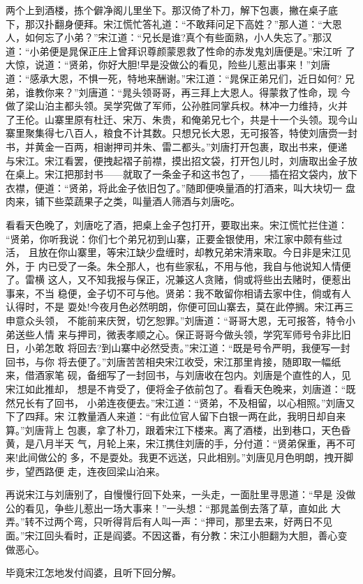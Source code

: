 两个上到酒楼，拣个僻净阁儿里坐下。那汉倚了朴刀，解下包裹，撇在桌子底
下，那汉扑翻身便拜。宋江慌忙答礼道：“不敢拜问足下高姓？”那人道：“大恩
人，如何忘了小弟？”宋江道：“兄长是谁?真个有些面熟，小人失忘了。”那汉
道：“小弟便是晁保正庄上曾拜识尊颜蒙恩救了性命的赤发鬼刘唐便是。”宋江听
了大惊，说道：“贤弟，你好大胆!早是没做公的看见，险些儿惹出事来！”刘唐
道：“感承大恩，不惧一死，特地来酬谢。”宋江道：“晁保正弟兄们，近日如何?
兄弟，谁教你来？”刘唐道：“晁头领哥哥，再三拜上大恩人。得蒙救了性命，现
今做了梁山泊主都头领。吴学究做了军师，公孙胜同掌兵权。林冲一力维持，火并
了王伦。山寨里原有杜迁、宋万、朱贵，和俺弟兄七个，共是十一个头领。现今山
寨里聚集得七八百人，粮食不计其数。只想兄长大恩，无可报答，特使刘唐赍一封
书，并黄金一百两，相谢押司并朱、雷二都头。”刘唐打开包裹，取出书来，便递
与宋江。宋江看罢，便拽起褶子前襟，摸出招文袋，打开包儿时，刘唐取出金子放
在桌上。宋江把那封书——就取了一条金子和这书包了，——插在招文袋内，放下
衣襟，便道：“贤弟，将此金子依旧包了。”随即便唤量酒的打酒来，叫大块切一
盘肉来，铺下些菜蔬果子之类，叫量酒人筛酒与刘唐吃。

看看天色晚了，刘唐吃了酒，把桌上金子包打开，要取出来。宋江慌忙拦住道：
“贤弟，你听我说：你们七个弟兄初到山寨，正要金银使用，宋江家中颇有些过活，
且放在你山寨里，等宋江缺少盘缠时，却教兄弟宋清来取。今日非是宋江见外，于
内已受了一条。朱仝那人，也有些家私，不用与他，我自与他说知人情便了。雷横
这人，又不知我报与保正，况兼这人贪赌，倘或将些出去赌时，便惹出事来，不当
稳便，金子切不可与他。贤弟：我不敢留你相请去家中住，倘或有人认得时，不是
耍处!今夜月色必然明朗，你便可回山寨去，莫在此停搁。宋江再三申意众头领，
不能前来庆贺，切乞恕罪。”刘唐道：“哥哥大恩，无可报答，特令小弟送些人情
来与押司，微表孝顺之心。保正哥哥今做头领，学究军师号令非比旧日，小弟怎敢
将回去?到山寨中必然受责。”宋江道：“既是号令严明，我便写一封回书，与你
将去便了。”刘唐苦苦相央宋江收受，宋江那里肯接，随即取一幅纸来，借酒家笔
砚，备细写了一封回书，与刘唐收在包内。刘唐是个直性的人，见宋江如此推却，
想是不肯受了，便将金子依前包了。看看天色晚来，刘唐道：“既然兄长有了回书，
小弟连夜便去。”宋江道：“贤弟，不及相留，以心相照。”刘唐又下了四拜。宋
江教量酒人来道：“有此位官人留下白银一两在此，我明日却自来算。”刘唐背上
包裹，拿了朴刀，跟着宋江下楼来。离了酒楼，出到巷口，天色昏黄，是八月半天
气，月轮上来，宋江携住刘唐的手，分付道：“贤弟保重，再不可来!此间做公的
多，不是耍处。我更不远送，只此相别。”刘唐见月色明朗，拽开脚步，望西路便
走，连夜回梁山泊来。

再说宋江与刘唐别了，自慢慢行回下处来，一头走，一面肚里寻思道：“早是
没做公的看见，争些儿惹出一场大事来！”一头想：“那晁盖倒去落了草，直如此
大弄。”转不过两个弯，只听得背后有人叫一声：“押司，那里去来，好两日不见
面。”宋江回头看时，正是阎婆。不因这番，有分教：宋江小胆翻为大胆，善心变
做恶心。

毕竟宋江怎地发付阎婆，且听下回分解。